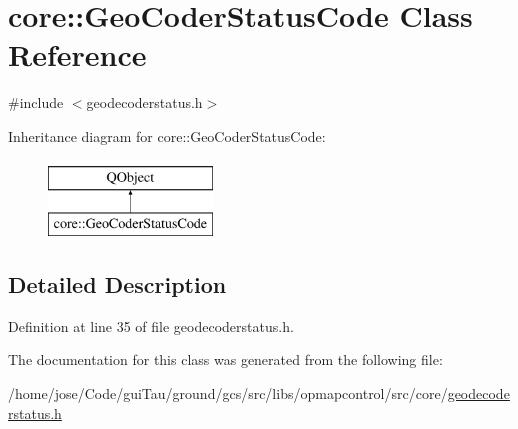 \hypertarget{classcore_1_1_geo_coder_status_code}{\section{core\-:\-:Geo\-Coder\-Status\-Code Class Reference}
\label{classcore_1_1_geo_coder_status_code}
}


{\ttfamily \#include $<$geodecoderstatus.\-h$>$}

Inheritance diagram for core\-:\-:Geo\-Coder\-Status\-Code\-:\begin{figure}[H]
\begin{center}
\leavevmode
\includegraphics[height=2.000000cm]{classcore_1_1_geo_coder_status_code}
\end{center}
\end{figure}


\subsection{Detailed Description}


Definition at line 35 of file geodecoderstatus.\-h.



The documentation for this class was generated from the following file\-:\begin{DoxyCompactItemize}
\item 
/home/jose/\-Code/gui\-Tau/ground/gcs/src/libs/opmapcontrol/src/core/\hyperlink{geodecoderstatus_8h}{geodecoderstatus.\-h}\end{DoxyCompactItemize}
